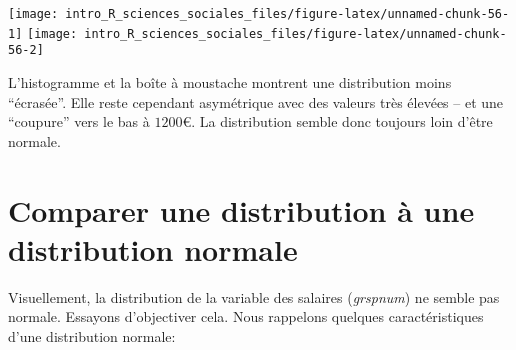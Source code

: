\documentclass[
]{book}
\newenvironment{Shaded}{\begin{snugshade}}{\end{snugshade}}
\newcommand{\AttributeTok}[1]{\textcolor[rgb]{0.77,0.63,0.00}{#1}}
\newcommand{\CommentTok}[1]{\textcolor[rgb]{0.56,0.35,0.01}{\textit{#1}}}
\newcommand{\FunctionTok}[1]{\textcolor[rgb]{0.00,0.00,0.00}{#1}}
\newcommand{\NormalTok}[1]{#1}
\newcommand{\SpecialCharTok}[1]{\textcolor[rgb]{0.00,0.00,0.00}{#1}}
\newcommand{\StringTok}[1]{\textcolor[rgb]{0.31,0.60,0.02}{#1}}
\begin{document}
\begin{Shaded}
\end{Shaded}

\texttt{[image: intro\_R\_sciences\_sociales\_files/figure-latex/unnamed-chunk-56-1]} \texttt{[image: intro\_R\_sciences\_sociales\_files/figure-latex/unnamed-chunk-56-2]}

L'histogramme et la boîte à moustache montrent une distribution moins ``écrasée''. Elle reste cependant asymétrique avec des valeurs très élevées -- et une ``coupure'' vers le bas à \(1200€\). La distribution semble donc toujours loin d'être normale.

\hypertarget{comparer-une-distribution-uxe0-une-distribution-normale}{%
\section{Comparer une distribution à une distribution normale}\label{comparer-une-distribution-uxe0-une-distribution-normale}}

Visuellement, la distribution de la variable des salaires (\emph{grspnum}) ne semble pas normale. Essayons d'objectiver cela. Nous rappelons quelques caractéristiques d'une distribution normale:
\end{document}
